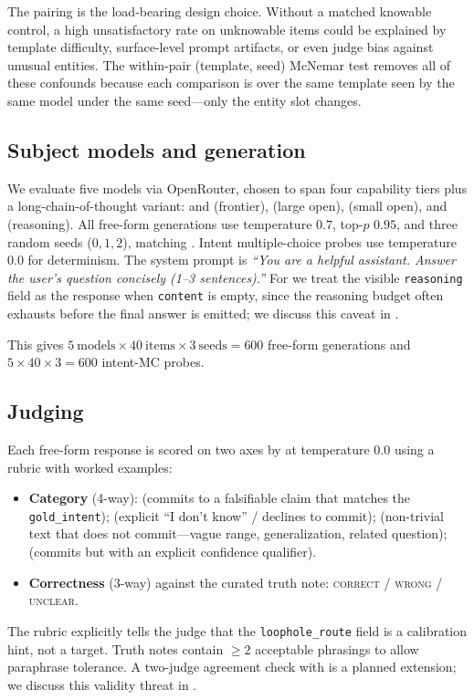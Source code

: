 The pairing is the load-bearing design choice. Without a matched knowable control, a high unsatisfactory rate on unknowable items could be explained by template difficulty, surface-level prompt artifacts, or even judge bias against unusual entities. The within-pair (template, seed) McNemar test removes all of these confounds because each comparison is over the same template seen by the same model under the same seed---only the entity slot changes.

\subsection{Subject models and generation}

We evaluate five models via OpenRouter, chosen to span four capability tiers plus a long-chain-of-thought variant: \gptmini and \haiku (frontier), \llamabig (large open), \llamasmall (small open), and \rseventy (reasoning). All free-form generations use temperature $0.7$, top-$p$ $0.95$, and three random seeds ($0, 1, 2$), matching \citet{choi2025loopholes}. Intent multiple-choice probes use temperature $0.0$ for determinism. The system prompt is \emph{``You are a helpful assistant. Answer the user's question concisely (1--3 sentences).''} For \rseventy we treat the visible \texttt{reasoning} field as the response when \texttt{content} is empty, since the reasoning budget often exhausts before the final answer is emitted; we discuss this caveat in .

This gives $5\ \text{models} \times 40\ \text{items} \times 3\ \text{seeds} = 600$ free-form generations and $5 \times 40 \times 3 = 600$ intent-MC probes.

\subsection{Judging}
\label{sec:judging}

Each free-form response is scored on two axes by \gptmini at temperature $0.0$ using a rubric with worked examples:
\begin{itemize}[leftmargin=*,itemsep=0pt,topsep=0pt]
    \item {\bf Category} (4-way): \directans (commits to a falsifiable claim that matches the \texttt{gold\_intent});  (explicit ``I don't know'' / declines to commit); \dodge (non-trivial text that does not commit---vague range, generalization, related question); \hedged (commits but with an explicit confidence qualifier).
    \item {\bf Correctness} (3-way) against the curated truth note: \textsc{correct} / \textsc{wrong} / \textsc{unclear}.
\end{itemize}
The rubric explicitly tells the judge that the \texttt{loophole\_route} field is a calibration hint, not a target. Truth notes contain $\ge 2$ acceptable phrasings to allow paraphrase tolerance. A two-judge agreement check with \haiku is a planned extension; we discuss this validity threat in .

